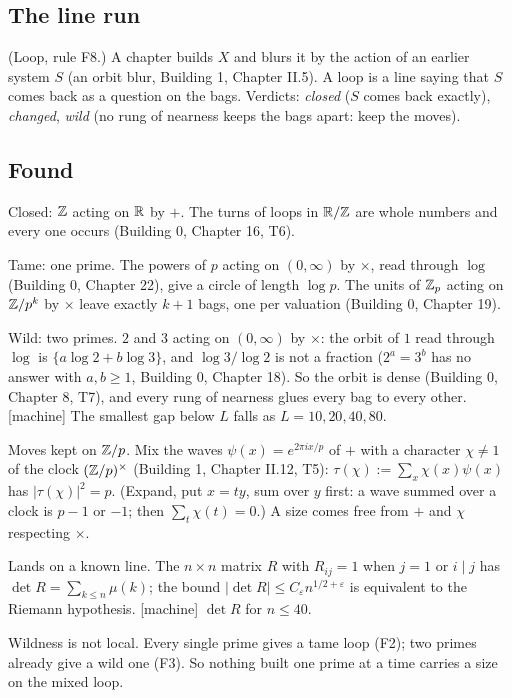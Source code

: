 \subsection*{The line run}

\begin{lines}
\item[\lab{L}] (Loop, rule F8.) A chapter builds $X$ and blurs it by the action of an earlier system $S$ (an orbit blur, Building 1, Chapter II.5). A loop is a line saying that $S$ comes back as a question on the bags. Verdicts: \emph{closed} ($S$ comes back exactly), \emph{changed}, \emph{wild} (no rung of nearness keeps the bags apart: keep the moves).
\end{lines}

\subsection*{Found}

\begin{lines}
\item[\lab{F1}] [proved] Closed: $\mathbb{Z}$ acting on $\mathbb{R}$ by $+$. The turns of loops in $\mathbb{R}/\mathbb{Z}$ are whole numbers and every one occurs (Building 0, Chapter 16, T6).
\item[\lab{F2}] [proved] Tame: one prime. The powers of $p$ acting on $(0, \infty)$ by $\times$, read through $\log$ (Building 0, Chapter 22), give a circle of length $\log p$. The units of $\mathbb{Z}_p$ acting on $\mathbb{Z}/p^k$ by $\times$ leave exactly $k + 1$ bags, one per valuation (Building 0, Chapter 19).
\item[\lab{F3}] [proved] Wild: two primes. $2$ and $3$ acting on $(0, \infty)$ by $\times$: the orbit of $1$ read through $\log$ is $\{a \log 2 + b \log 3\}$, and $\log 3 / \log 2$ is not a fraction ($2^a = 3^b$ has no answer with $a, b \ge 1$, Building 0, Chapter 18). So the orbit is dense (Building 0, Chapter 8, T7), and every rung of nearness glues every bag to every other. [machine] The smallest gap below $L$ falls as $L = 10, 20, 40, 80$.
\item[\lab{F4}] [proved] Moves kept on $\mathbb{Z}/p$. Mix the waves $\psi(x) = e^{2\pi i x/p}$ of $+$ with a character $\chi \ne 1$ of the clock $(\mathbb{Z}/p)^\times$ (Building 1, Chapter II.12, T5): $\tau(\chi) := \sum_x \chi(x)\psi(x)$ has $|\tau(\chi)|^2 = p$. (Expand, put $x = ty$, sum over $y$ first: a wave summed over a clock is $p - 1$ or $-1$; then $\sum_t \chi(t) = 0$.) A size comes free from $+$ and $\chi$ respecting $\times$.
\item[\lab{F5}] [reported] Lands on a known line. The $n \times n$ matrix $R$ with $R_{ij} = 1$ when $j = 1$ or $i \mid j$ has $\det R = \sum_{k \le n} \mu(k)$; the bound $|\det R| \le C_\varepsilon n^{1/2 + \varepsilon}$ is equivalent to the Riemann hypothesis. [machine] $\det R$ for $n \le 40$.
\item[\lab{F6}] [proved] Wildness is not local. Every single prime gives a tame loop (F2); two primes already give a wild one (F3). So nothing built one prime at a time carries a size on the mixed loop.
\end{lines}

